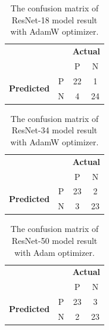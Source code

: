 \begin{table}[!h]
\centering
\caption{The confusion matrix of ResNet-18 model result with AdamW optimizer.}
\label{tab:conf_resnet18}
\begin{tabular}{|cc|c|c|}
\cline{1-4}
                                                 &   & \multicolumn{2}{c|}{\textbf{Actual}} \\ \cline{3-4} 
                                                 &   & P            & N            \\ \hline
\multicolumn{1}{|c|}{\multirow{2}{*}{\textbf{Predicted}}} & P & 22           & 1            \\ \cline{2-4} 
\multicolumn{1}{|c|}{}                           & N & 4            & 24           \\ \hline
\end{tabular}
\end{table}

\begin{table}[!h]
\centering
\caption{The confusion matrix of ResNet-34 model result with AdamW optimizer.}
\label{tab:conf_resnet34}
\begin{tabular}{|cc|c|c|}
\cline{1-4}
                                                 &   & \multicolumn{2}{c|}{\textbf{Actual}} \\ \cline{3-4} 
                                                 &   & P            & N            \\ \hline
\multicolumn{1}{|c|}{\multirow{2}{*}{\textbf{Predicted}}} & P & 23           & 2            \\ \cline{2-4} 
\multicolumn{1}{|c|}{}                           & N & 3            & 23           \\ \hline
\end{tabular}
\end{table}

\begin{table}[!h]
\centering
\caption{The confusion matrix of ResNet-50 model result with Adam optimizer.}
\label{tab:conf_resnet50}
\begin{tabular}{|cc|c|c|}
\cline{1-4}
                                                 &   & \multicolumn{2}{c|}{\textbf{Actual}} \\ \cline{3-4} 
                                                 &   & P            & N            \\ \hline
\multicolumn{1}{|c|}{\multirow{2}{*}{\textbf{Predicted}}} & P & 23           & 3            \\ \cline{2-4} 
\multicolumn{1}{|c|}{}                           & N & 2            & 23           \\ \hline
\end{tabular}
\end{table}

